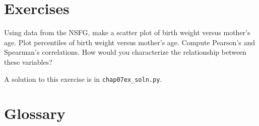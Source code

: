 \documentclass[12pt]{book}
\begin{document}
\section{Exercises}

\begin{exercise}
Using data from the NSFG, make a scatter plot of birth weight
versus mother's age.  Plot percentiles of birth weight
versus mother's age.  Compute Pearson's and Spearman's correlations.
How would you characterize the relationship
between these variables?

A solution to this exercise is in \verb"chap07ex_soln.py".
\end{exercise}


\section{Glossary}
\end{document}
